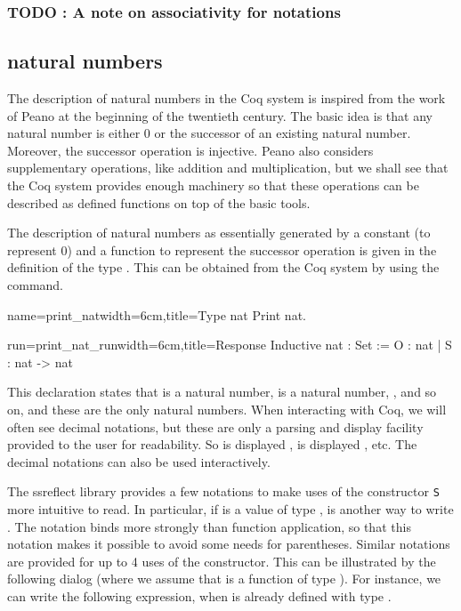 \subsubsection{TODO : A note on associativity for notations}

\subsection{natural numbers}
The description of natural numbers in the Coq system is inspired from
the work of Peano at the beginning of the twentieth century.  The
basic idea is that any natural number is either 0 or the successor of
an existing natural number.  Moreover, the successor operation is
injective.  Peano also considers supplementary operations, like
addition and multiplication, but we shall see that the Coq system
provides enough machinery so that these operations can be described as
defined functions on top of the basic tools.

The description of natural numbers as essentially generated by a
constant  (to represent 0) and a function  to represent 
the successor operation is given in the definition of the type
. This can
be obtained from the Coq system by using the  command.

\begin{coq}{name=print_nat}{width=6cm,title=Type nat}
Print nat.

\end{coq}
\begin{coqout}{run=print_nat_run}{width=6cm,title=Response}
Inductive nat : Set :=  O : nat | S : nat -> nat
\end{coqout}

This declaration states that  is a natural number,  is a
natural number, , and so on, and these are the only natural
numbers.  When interacting with Coq, we will often see decimal
notations, but these are only a parsing and display
facility provided to the user for readability.  So  is displayed
,  is displayed , etc.  The decimal notations can
also be used interactively.

The ssreflect library provides a few notations to make uses of the
constructor {\tt S} more intuitive to read.  In particular, if 
is a value of type ,  is another way to write .  The  notation binds more strongly than function
application, so that this notation makes it possible to avoid some
needs for parentheses.
Similar notations are provided for up to 4 uses of the 
constructor.  This can be illustrated by the following dialog (where
we assume that  is a function of type ).
  For instance, we can write the following
expression, when  is already defined with type .

